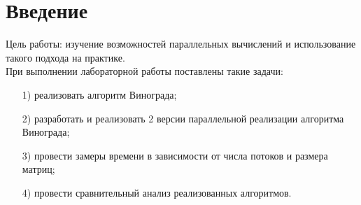 \chapter*{Введение}
\label{cha:intro}
Цель работы: изучение возможностей параллельных вычислений и использование такого подхода на практике.\\
При выполнении лабораторной работы поставлены такие задачи:
\begin{enumerate}
	\item[1)] реализовать алгоритм Винограда;
	\item[2)] разработать и реализовать 2 версии параллельной реализации алгоритма Винограда;
	\item[3)] провести замеры времени в зависимости от числа потоков и размера матриц;
	\item[4)] провести сравнительный анализ реализованных алгоритмов.
\end{enumerate}
